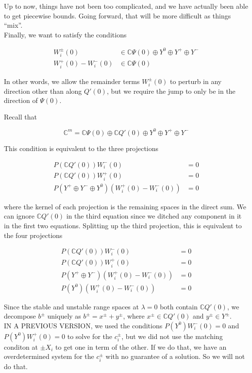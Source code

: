 \documentclass[12pt]{article}
\def\C{{\mathbb C}}
\begin{document}
Up to now, things have not been too complicated, and we have actually been able to get piecewise bounds. Going forward, that will be more difficult as things ``mix''.\\

Finally, we want to satisfy the conditions

\begin{align*}
W_i^\pm(0) &\in \C \Psi(0) \oplus Y^0 \oplus Y^+ \oplus Y^- \\
W_i^+(0) - W_i^-(0) &\in \C \Psi(0)
\end{align*}

In other words, we allow the remainder terms $W_i^\pm(0)$ to perturb in any direction other than along $Q'(0)$, but we require the jump to only be in the direction of $\Psi(0)$.

Recall that

\[
\C^m = \C \Psi(0) \oplus \C Q'(0) \oplus Y^0 \oplus Y^+ \oplus Y^- 
\]

This condition is equivalent to the three projections

\begin{align*}
P(\C Q'(0))W_i^-(0) &= 0 \\
P(\C Q'(0))W_i^+(0) &= 0 \\
P(Y^+ \oplus Y^- \oplus Y^0) ( W_i^+(0) - W_i^-(0) ) &= 0
\end{align*}

where the kernel of each projection is the remaining spaces in the direct sum. We can ignore $\C Q'(0)$ in the third equation since we ditched any component in it in the first two equations. Splitting up the third projection, this is equivalent to the four projections

\begin{align*}
P(\C Q'(0))W_i^-(0) &= 0 \\
P(\C Q'(0))W_i^+(0) &= 0 \\
P(Y^+ \oplus Y^-) ( W_i^+(0) - W_i^-(0) ) &= 0 \\
P(Y^0) ( W_i^+(0) - W_i^-(0) ) &= 0
\end{align*}

Since the stable and unstable range spaces at $\lambda = 0$ both contain $\C Q'(0)$, we decompose $b^\pm$ uniquely as $b^\pm = x^\pm + y^\pm$, where $x^\pm \in \C Q'(0)$ and $y^\pm \in Y^\pm$.\\

IN A PREVIOUS VERSION, we used the conditions $P(Y^0)W_i^-(0) = 0$ and $P(Y^0)W_i^+(0) = 0$ to solve for the $c_i^\pm$, but we did not use the matching conditon at $\pm X_i$ to get one in term of the other. If we do that, we have an overdetermined system for the $c_i^\pm$ with no guarantee of a solution. So we will not do that.\\
\end{document}
